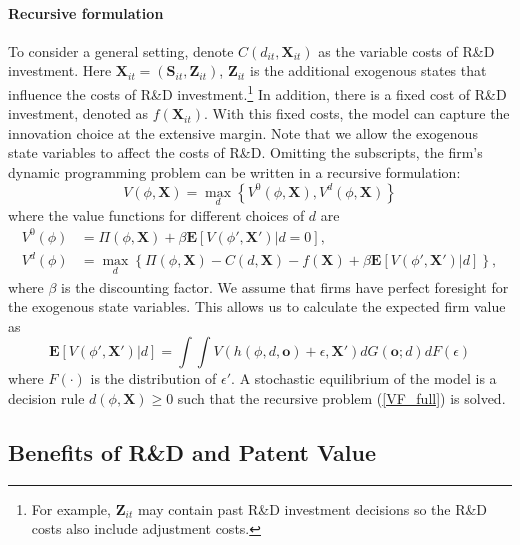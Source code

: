 \paragraph{Recursive formulation}
To consider a general setting, denote $C(d_{it}, \mathbf{X}_{it})$ as the variable costs of R\&D investment. Here $\mathbf{X}_{it}=(\mathbf{S}_{it}, \mathbf{Z}_{it})$, $\mathbf{Z}_{it}$ is the additional exogenous states that influence the costs of R\&D investment.\footnote{For example, $\mathbf{Z}_{it}$ may contain past R\&D investment decisions so the R\&D costs also include adjustment costs.} In addition, there is a fixed cost of R\&D investment, denoted as $f(\mathbf{X}_{it})$. With this fixed costs, the model can capture the innovation choice at the extensive margin. Note that we allow the exogenous state variables to affect the costs of R\&D. Omitting the subscripts, the firm's dynamic programming problem can be written in a recursive formulation:
\begin{equation}\label{VF_full}
    V(\phi, \mathbf{X}) =\max_{d}\left\{V^0(\phi, \mathbf{X}), V^d(\phi, \mathbf{X})\right\} 
\end{equation}
where the value functions for different choices of $d$ are
\begin{align}
    V^0(\phi)&=\Pi(\phi,\mathbf{X})+ \beta \mathbf{E}\left[ V(\phi', \mathbf{X}')|d=0\right], \\
    V^d(\phi)&=\max_{d} \left\{ \Pi(\phi,\mathbf{X})-C(d, \mathbf{X}) - f(\mathbf{X}) + \beta \mathbf{E}\left[ V(\phi', \mathbf{X}')|d\right]\right\}, \label{VF_d}
\end{align}
where $\beta$ is the discounting factor. We assume that firms have perfect foresight for the exogenous state variables. This allows us to calculate the expected firm value as
\begin{equation}\label{EV_d}
    \mathbf{E}\left[ V(\phi', \mathbf{X}')|d\right] = \int\int V(h(\phi,d,\mathbf{o})+\epsilon,\mathbf{X}')dG(\mathbf{o};d)dF(\epsilon)
\end{equation}
where $F(\cdot)$ is the distribution of $\epsilon'$. 
A stochastic equilibrium of the model is a decision rule $d(\phi, \mathbf{X})\geq0$ such that the recursive problem (\ref{VF_full}) is solved.
\subsection{Benefits of R\&D and Patent Value}
